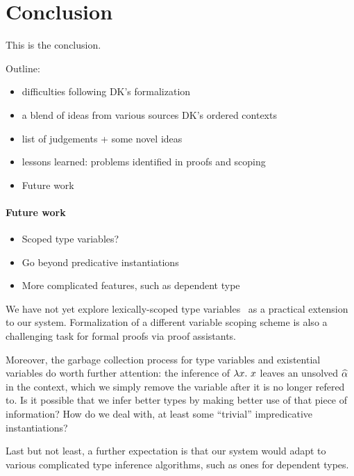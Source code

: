 \section{Conclusion}

This is the conclusion.


Outline:
\begin{itemize}
    \item difficulties following DK's formalization
    \item a blend of ideas from various sources DK's ordered contexts
    \item list of judgements + some novel ideas
    \item lessons learned: problems identified in proofs and scoping
    \item Future work
\end{itemize}



\paragraph{Future work}
\begin{itemize}
    \item Scoped type variables?
    \item Go beyond predicative instantiations
    \item More complicated features, such as dependent type
\end{itemize}

We have not yet explore lexically-scoped type variables~\cite{jones2003lexically}
as a practical extension to our system.
Formalization of a different variable scoping scheme is also
a challenging task for formal proofs via proof assistants.

Moreover, the garbage collection process for type variables and
existential variables do worth further attention:
the inference of $\lam x$ leaves an unsolved $\al$ in the context,
which we simply remove the variable after it is no longer refered to.
Is it possible that we infer better types by making better use of that piece of information?
How do we deal with, at least some ``trivial'' impredicative instantiations?

Last but not least, a further expectation is that our system would
adapt to various complicated type inference algorithms,
such as ones for dependent types.
